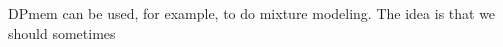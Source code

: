 \documentclass[11pt]{article}
\begin{document}
DPmem can be used, for example, to do mixture modeling.  The idea is that we should sometimes


\pagebreak

\begin{thebibliography}{99}



\end{thebibliography}
\end{document}
